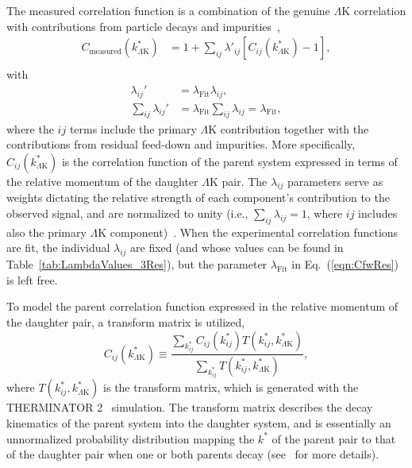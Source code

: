 \documentclass[ALICE,manyauthors]{cernphprep}
\newcommand{\kstar}{$k^{*}$\xspace}
\newcommand{\LamK}{$\Lambda$K\xspace}
\begin{document}
The measured correlation function is a combination of the genuine \LamK correlation with contributions from particle decays and impurities~\cite{Kisiel:2014mma},
\begin{equation}
\begin{aligned}
\label{eqn:CfwRes} 
 C_{\mathrm{measured}}(k^{*}_{\Lambda\mathrm{K}}) &= 1 + \sum\limits_{ij}  \lambda'_{ij}[C_{ij}(k^{*}_{\Lambda\mathrm{K}})-1], \\
\end{aligned} 
\end{equation}
with
\begin{equation}
\begin{aligned}
\label{eqn:CfwRes2} 
 \lambda_{ij}' &= \lambda_{\mathrm{Fit}}\lambda_{ij}, \\
 \sum\limits_{ij}\lambda_{ij}' &=  \lambda_{\mathrm{Fit}}\sum\limits_{ij}\lambda_{ij} = \lambda_{\mathrm{Fit}},
\end{aligned} 
\end{equation}
where the $ij$ terms include the primary \LamK contribution together with the contributions from residual feed-down and impurities.
More specifically, $C_{ij}(k^{*}_{\Lambda\mathrm{K}})$ is the correlation function of the parent system expressed in terms of the relative momentum of the daughter \LamK pair.  
The $\lambda_{ij}$ parameters serve as weights dictating the relative strength of each component's contribution to the observed signal, and are normalized to unity (i.e., $\sum_{ij} \lambda_{ij} = 1$, where $ij$ includes also the primary \LamK component)~\cite{Kisiel:2014mma, Acharya:2018gyz}.
When the experimental correlation functions are fit, the individual $\lambda_{ij}$ are fixed (and whose values can be found in Table~\ref{tab:LambdaValues_3Res}), but the parameter $\lambda_{\mathrm{Fit}}$ in Eq.~(\ref{eqn:CfwRes}) is left free.


To model the parent correlation function expressed in the relative momentum of the daughter pair, a transform matrix is utilized,
\begin{equation}
  C_{ij}(k^{*}_{\Lambda\mathrm{K}}) \equiv \frac{\sum\limits_{k^{*}_{ij}} C_{ij}\left(k^{*}_{ij}\right) T\left(k^{*}_{ij},k^{*}_{\Lambda\mathrm{K}}\right)}{\sum\limits_{k^{*}_{ij}} T\left(k^{*}_{ij},k^{*}_{\Lambda\mathrm{K}}\right)},
\label{eqn:ResidualsTransform}
\end{equation}
where $T(k^{*}_{ij},k^{*}_{\Lambda\mathrm{K}})$ is the transform matrix, which is generated with the THERMINATOR 2~\cite{Chojnacki:2011hb} simulation. 
The transform matrix describes the decay kinematics of the parent system into the daughter system, and is essentially an unnormalized probability distribution mapping the \kstar of the parent pair to that of the daughter pair when one or both parents decay (see~\cite{Kisiel:2014mma} for more details).
\end{document}
